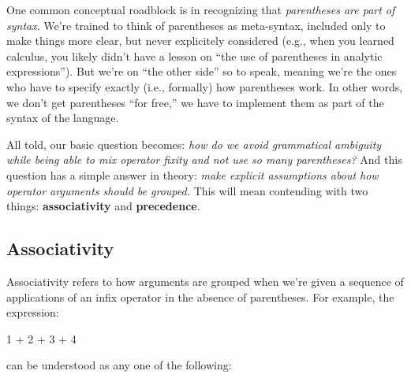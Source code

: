 \begin{remark}
  \label{rmk:parens}
  One common conceptual roadblock is in recognizing that \textit{parentheses are part of syntax}.
  We're trained to think of parentheses as meta-syntax, included only to make things more clear, but never explicitely considered (e.g., when you learned calculus, you likely didn't have a lesson on \enquote{the use of parentheses in analytic expressions}).
  But we're on \enquote{the other side} so to speak, meaning we're the ones who have to specify exactly (i.e., formally) how parentheses work.
  In other words, we don't get parentheses \enquote{for free,} we have to implement them as part of the syntax of the language.
\end{remark}
%
All told, our basic question becomes: \textit{how do we avoid grammatical ambiguity while being able to mix operator fixity and not use so many parentheses?}
And this question has a simple answer in theory: \textit{make explicit assumptions about how operator arguments should be grouped.}
This will mean contending with two things: \textbf{associativity} and \textbf{precedence}.

\subsection{Associativity}

Associativity refers to how arguments are grouped when we're given a sequence of applications of an infix operator in the absence of parentheses.
For example, the expression:

\begin{ocaml}
1 + 2 + 3 + 4
\end{ocaml}
%
can be understood as any one of the following:

